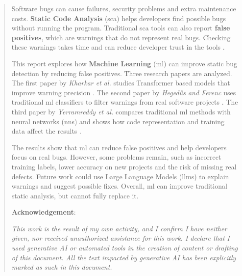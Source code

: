 \begin{abstract}
\hspace{0.6em} Software bugs can cause failures, security problems and extra maintenance costs. \textbf{Static Code Analysis} (\gls{sca}) helps developers find possible bugs without running the program. Traditional \gls{sca} tools can also report \textbf{false positives}, which are warnings that do not represent real bugs. Checking these warnings takes time and can reduce developer trust in the tools \cite{paperreference1_ayewah2008using,paperreference2_bessey2010few}.

\hspace{0.6em} This report explores how \textbf{Machine Learning} (\gls{ml}) can improve static bug detection by reducing false positives. Three research papers are analyzed. The first paper by \textit{Kharkar et al.} studies Transformer based models that improve warning precision \cite{paper1_kharkarlearning2022}. The second paper by \textit{Hegedűs and Ferenc} uses traditional \gls{ml} classifiers to filter warnings from real software projects \cite{paper2_hegedHus2022static}. The third paper by \textit{Yerramreddy et al.} compares traditional \gls{ml} methods with neural networks (\gls{nns}) and shows how code representation and training data affect the results \cite{paper3_yerramreddy2023empirical}.

\hspace{0.6em} The results show that \gls{ml} can reduce false positives and help developers focus on real bugs. However, some problems remain, such as incorrect training labels, lower accuracy on new projects and the risk of missing real defects. Future work could use Large Language Models (\gls{llms}) to explain warnings and suggest possible fixes. Overall, \gls{ml} can improve traditional static analysis, but cannot fully replace it. \newline

\hspace{0.6em} \textbf{Acknowledgement}:

\hspace{0.6em} \textit{This work is the result of my own activity, and I confirm I have neither given, nor received unauthorized assistance for this work. I declare that I used generative AI or automated tools in the creation of content or drafting of this document. All the text impacted by generative AI has been explicitly marked as such in this document.}

\end{abstract}
